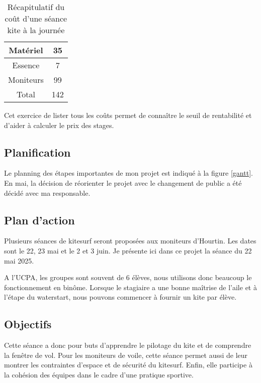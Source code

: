 \documentclass[11pt,a4paper]{report}
\begin{document}
\begin{table}
\begin{centering}
\begin{tabular}{|c|c|}
\hline
Matériel  & 35 \\
\hline
Essence   & 7   \\
\hline
Moniteurs  & 99 \\
\hline
Total     & 142 \\
\hline
\end{tabular}
\caption{Récapitulatif du co\^ut d'une séance kite à la journée\label{cout_journalier}}
\end{centering}
\end{table}

Cet exercice de lister tous les co\^uts permet de connaître le seuil 
de rentabilité et d'aider à calculer le prix des stages.

\subsection{Planification}
Le planning des étapes importantes de mon projet est indiqué
à la figure \ref{gantt}. En mai, la décision de  réorienter 
le projet avec le changement de public a été décidé avec
ma responsable. 

\subsection{Plan d'action}
Plusieurs séances de kitesurf seront proposées aux moniteurs d'Hourtin.
Les dates sont le 22, 23 mai et le 2 et 3 juin.
Je présente ici dans ce projet la séance du 22 mai 2025.

A l'UCPA, les groupes sont souvent de 6 élèves, nous
utilisons donc beaucoup le fonctionnement en bin\^ome. 
Lorsque le stagiaire a une bonne maîtrise de l'aile et
à l'étape du waterstart, nous pouvons commencer à fournir
un kite par élève.
\subsection{Objectifs}
Cette séance a donc pour  buts d'apprendre le
pilotage du kite et de comprendre la fen\^etre de vol.
Pour les moniteurs de voile, cette séance permet
aussi de leur montrer les contraintes d'espace et
de sécurité du kitesurf. 
Enfin, elle participe à la cohésion des équipes
dans le cadre d'une pratique sportive.
\end{document}
